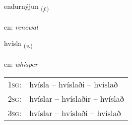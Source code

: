 \documentclass[frontgrid, backgrid]{flacards}\usepackage[]{graphicx}\usepackage[]{xcolor}
\begin{document}
\renewcommand{\blhead}{\vskip5pt {\small\bfseries\footnotesize Nafnorð | Noun }}
\renewcommand{\bcfoot}{\vskip5pt \hspace{2pt}{\small\bfseries\footnotesize 3K}}


{endurnýjun \small{\textsubscript{(\textit{f.})}} \\[1ex] %
\textphonetic{[ɛntʏrnijʏn]} \\
en: \emph{renewal} \\  [2ex]
\renewcommand*{\arraystretch}{0.8}
}

\renewcommand{\flhead}{\vskip5pt \fboxsep=0pt {\small\bfseries\footnotesize Sagnorð | Verb}}
\renewcommand{\fcfoot}{\vskip5pt \fboxsep=0pt \hspace{2pt}{\small\bfseries\footnotesize 3K}}

\renewcommand{\blhead}{\vskip5pt {\small\bfseries\footnotesize Sagnorð | Verb }}
\renewcommand{\bcfoot}{\vskip5pt \hspace{2pt}{\small\bfseries\footnotesize 3K}}


{hvísla \small{\textsubscript{(\textit{v.})}} \\[1ex] %
\textphonetic{[kʰvistla]} \\
en: \emph{whisper} \\  [2ex]
\renewcommand*{\arraystretch}{0.8}
\begin{tabular}{p{1cm}l}
\textsc{1sg}: & hvísla -- hvíslaði -- hvíslað \\ 
\textsc{2sg}: & hvíslar -- hvíslaðir -- hvíslað \\ 
\textsc{3sg}: & hvíslar -- hvíslaði -- hvíslað \\ 
\end{tabular}
}
\end{document}
